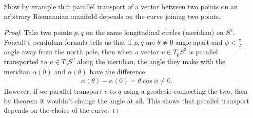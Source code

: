 \documentclass[12pt]{article}
\begin{document}
\begin{problem}[Do Carmo 3.5]
Show by example that parallel transport of a vector between two points on an arbitrary Riemannian manifold depends on the curve joining two points.
\end{problem}
\begin{proof}
Take two points $ p,q $ on the same longitudinal circles (meridian) on  $ S^2$. Foucalt's pendulum formula tells us that if $ p,q$ are  $ \theta \neq 0 $ angle apart and $ \phi < \frac{ \pi}{ 2}$ angle away from the north pole, then when a vector $ v \in T_p S^2$ is parallel transported to  $ u \in T_q S^2$ along the meridian, the angle they make with the meridian $ \alpha(0)$ and $ \alpha(\theta)$ have the difference
 \begin{align*}
	\alpha(\theta) - \alpha(0) = \theta \cos \phi \neq 0 .
\end{align*}
However, if we parallel transport $ v$ to $ q$ using a geodesic connecting the two, then by theorem it wouldn't change the angle at all. This shows that parallel transport depends on the choice of the curve.
\end{proof}
\end{document}
